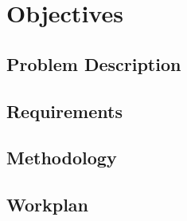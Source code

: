 \chapter{Objectives}
\section{Problem Description}
\section{Requirements}
\section{Methodology}
\section{Workplan}
